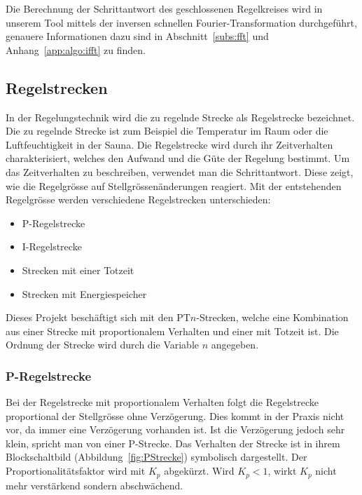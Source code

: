 Die  Berechnung   der  Schrittantwort  des  geschlossenen   Regelkreises  wird
in  unserem   Tool  mittels  der  inversen   schnellen  Fourier-Transformation
durchgef\"uhrt, genauere  Informationen dazu sind  in Abschnitt~\ref{subs:fft}
und Anhang~\ref{app:algo:ifft} zu finden.


\subsection{Regelstrecken}

In  der  Regelungstechnik  wird  die  zu  regelnde  Strecke  als  Regelstrecke
bezeichnet. Die  zu  regelnde  Strecke  ist zum  Beispiel  die  Temperatur  im
Raum  oder die  Luftfeuchtigkeit  in der  Sauna. Die  Regelstrecke wird  durch
ihr  Zeitverhalten  charakterisiert,  welches   den  Aufwand  und  die  G\"ute
der  Regelung   bestimmt. Um  das  Zeitverhalten  zu   beschreiben,  verwendet
man   die   Schrittantwort.    Diese   zeigt,  wie   die   Regelgr\"osse   auf
Stellgr\"ossen\"anderungen reagiert. Mit der entstehenden Regelgr\"osse werden
verschiedene Regelstrecken unterschieden:

\begin{itemize}
    \item
        P-Regelstrecke
    \item
        I-Regelstrecke
    \item
        Strecken mit einer Totzeit
    \item
        Strecken mit Energiespeicher
\end{itemize}

Dieses  Projekt  besch\"aftigt  sich   mit  den  PT$n$-Strecken,  welche  eine
Kombination  aus einer  Strecke  mit proportionalem  Verhalten  und einer  mit
Totzeit ist. Die Ordnung der Strecke wird durch die Variable $n$ angegeben.


\subsubsection*{P-Regelstrecke}
Bei  der  Regelstrecke mit  proportionalem  Verhalten  folgt die  Regelstrecke
proportional der  Stellgr\"osse ohne  Verz\"ogerung. Dies kommt in  der Praxis
nicht vor,  da immer eine  Verz\"ogerung vorhanden ist. Ist  die Verz\"ogerung
jedoch  sehr  klein, spricht  man   von  einer  P-Strecke. Das  Verhalten  der
Strecke ist in ihrem Blockschaltbild (Abbildung~\ref{fig:PStrecke}) symbolisch
dargestellt. Der  Proportionalit\"atsfaktor wird  mit $K_p$  abgek\"urzt. Wird
$K_p<1$, wirkt $K_p$ nicht mehr verst\"arkend sondern abschw\"achend.

